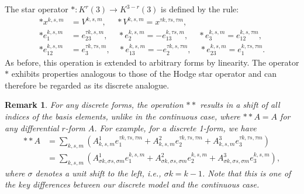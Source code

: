 \documentclass[english]{article}
\theoremstyle{plain}
\newtheorem{rem}[thm]{Remark}
\theoremstyle{definition}
\theoremstyle{remark}
\numberwithin{equation}{section}
\begin{document}
The star operator $\ast: K^r(3)\rightarrow  K^{3-r}(3)$ is defined  by the rule:
\begin{align}\label{2.12}
\ast x^{k,s,m}&=V^{k,s,m}, \ \quad \ast V^{k,s,m}=x^{\tau k,\tau s,\tau m}, \nonumber \\
\ast e^{k,s,m}_1&=e^{\tau k,s,m}_{23}, \ \quad \ast e^{k,s,m}_2=-e^{k,\tau s,m}_{13}, \
\quad \ast e^{k,s,m}_3=e^{k,s,\tau m}_{12}, \nonumber \\
\ast e^{k,s, m}_{12}&=e^{\tau k,\tau s,m}_3, \quad \ast e^{k,s, m}_{13}=-e^{\tau k,s,\tau m}_2, \quad \ast e^{k,s, m}_{23}=e^{k,\tau s,\tau m}_1.
\end{align}
As before, this operation is extended to arbitrary forms by linearity. The operator $\ast$
 exhibits properties analogous to those of the Hodge star operator and can therefore be regarded as its discrete analogue.
\begin{rem}
For any discrete forms, the operation $\ast\ast$ results in a shift of all indices of the basis elements, unlike in the continuous case, where $\ast\ast A=A$ for any differential $r$-form $A$. For example, for a discrete 1-form, we have
\begin{align*}\label{2.4}
\ast\ast A&=\sum_{k,s,m}(A^1_{k,s,m}e_1^{\tau k,\tau s, \tau m}+A^2_{k,s,m}e_2^{\tau k,\tau s, \tau m}+A^3_{k,s,m}e_3^{\tau k,\tau s, \tau m})\\
&=\sum_{k,s,m}(A^1_{\sigma k, \sigma s, \sigma m}e_1^{k,s,m}+A^2_{\sigma k, \sigma s, \sigma m}e_2^{k,s,m}+A^3_{\sigma k, \sigma s, \sigma m}e_3^{k,s,m}),
\end{align*}
where  $\sigma$  denotes a unit shift to the left, i.e., $\sigma k=k-1$.
  Note that this is one of the key differences between our discrete model and the continuous case.
\end{rem}
\end{document}
